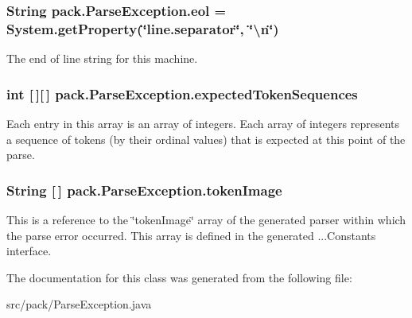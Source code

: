 \subsubsection[{\texorpdfstring{eol}{eol}}]{\setlength{\rightskip}{0pt plus 5cm}String pack.\+Parse\+Exception.\+eol = System.\+get\+Property(\char`\"{}line.\+separator\char`\"{}, \char`\"{}\textbackslash{}n\char`\"{})\hspace{0.3cm}{\ttfamily [protected]}}\hypertarget{classpack_1_1_parse_exception_a1a4505eb551f8364ad29f84ea805fe7b}{}\label{classpack_1_1_parse_exception_a1a4505eb551f8364ad29f84ea805fe7b}
The end of line string for this machine. 
\subsubsection[{\texorpdfstring{expected\+Token\+Sequences}{expectedTokenSequences}}]{\setlength{\rightskip}{0pt plus 5cm}int \mbox{[}$\,$\mbox{]}\mbox{[}$\,$\mbox{]} pack.\+Parse\+Exception.\+expected\+Token\+Sequences}\hypertarget{classpack_1_1_parse_exception_aded466561b7bf1e713e6acc68ba9a04d}{}\label{classpack_1_1_parse_exception_aded466561b7bf1e713e6acc68ba9a04d}
Each entry in this array is an array of integers. Each array of integers represents a sequence of tokens (by their ordinal values) that is expected at this point of the parse. 
\subsubsection[{\texorpdfstring{token\+Image}{tokenImage}}]{\setlength{\rightskip}{0pt plus 5cm}String \mbox{[}$\,$\mbox{]} pack.\+Parse\+Exception.\+token\+Image}\hypertarget{classpack_1_1_parse_exception_a7897eecab28c89c7da8d0c1ce195782c}{}\label{classpack_1_1_parse_exception_a7897eecab28c89c7da8d0c1ce195782c}
This is a reference to the \char`\"{}token\+Image\char`\"{} array of the generated parser within which the parse error occurred. This array is defined in the generated ...Constants interface. 

The documentation for this class was generated from the following file\+:\begin{DoxyCompactItemize}
\item 
src/pack/Parse\+Exception.\+java\end{DoxyCompactItemize}
